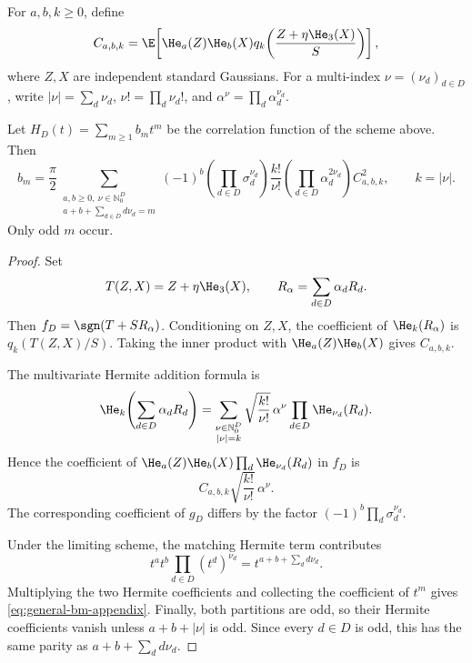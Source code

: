 For \(a,b,k\geq 0\), define
\begin{equation}
    C_{a,b,k}
    =
    \E\!\left[
        \He_a(Z)\He_b(X)
        q_k\!\left(
            \frac{Z+\eta\He_3(X)}{S}
        \right)
    \right],
    \label{eq:general-Cabk}
\end{equation}
where \(Z,X\) are independent standard Gaussians. For a multi-index
\(\nu=(\nu_d)_{d\in D}\), write
\(
|\nu|=\sum_d\nu_d
\),
\(
\nu!=\prod_d\nu_d!
\), and
\(
\alpha^\nu=\prod_d\alpha_d^{\nu_d}
\).

\begin{proposition}
\label{prop:general-degree-formula}
Let
\(
H_D(t)=\sum_{m\geq 1}b_m t^m
\)
be the correlation function of the scheme above. Then
\begin{equation}
    b_m
    =
    \frac{\pi}{2}
    \sum_{\substack{a,b\geq 0,\ \nu\in\mathbb{N}_0^D\\
          a+b+\sum_{d\in D}d\nu_d=m}}
    (-1)^b
    \left(\prod_{d\in D}\sigma_d^{\nu_d}\right)
    \frac{k!}{\nu!}
    \left(\prod_{d\in D}\alpha_d^{2\nu_d}\right)
    C_{a,b,k}^2,
    \qquad
    k=|\nu|.
    \label{eq:general-bm-appendix}
\end{equation}
Only odd \(m\) occur.
\end{proposition}

\begin{proof}
Set
\[
    T(Z,X)=Z+\eta\He_3(X),
    \qquad
    R_\alpha=\sum_{d\in D}\alpha_dR_d.
\]
Then \(f_D=\sgn(T+SR_\alpha)\). Conditioning on \(Z,X\), the coefficient
of \(\He_k(R_\alpha)\) is
\(
q_k(T(Z,X)/S)
\). Taking the inner product with
\(\He_a(Z)\He_b(X)\) gives \(C_{a,b,k}\).

The multivariate Hermite addition formula is
\[
    \He_k\!\left(\sum_{d\in D}\alpha_dR_d\right)
    =
    \sum_{\substack{\nu\in\mathbb{N}_0^D\\|\nu|=k}}
    \sqrt{\frac{k!}{\nu!}}\,
    \alpha^\nu
    \prod_{d\in D}\He_{\nu_d}(R_d).
\]
Hence the coefficient of
\(
\He_a(Z)\He_b(X)\prod_d\He_{\nu_d}(R_d)
\)
in \(f_D\) is
\[
    C_{a,b,k}
    \sqrt{\frac{k!}{\nu!}}\,
    \alpha^\nu.
\]
The corresponding coefficient of \(g_D\) differs by the factor
\(
(-1)^b\prod_d\sigma_d^{\nu_d}
\).

Under the limiting scheme, the matching Hermite term contributes
\[
    t^a t^b\prod_{d\in D}(t^d)^{\nu_d}
    =
    t^{a+b+\sum_d d\nu_d}.
\]
Multiplying the two Hermite coefficients and collecting the coefficient
of \(t^m\) gives \eqref{eq:general-bm-appendix}. Finally, both partitions
are odd, so their Hermite coefficients vanish unless
\(a+b+|\nu|\) is odd. Since every \(d\in D\) is odd, this has the same
parity as \(a+b+\sum_d d\nu_d\).
\end{proof}


